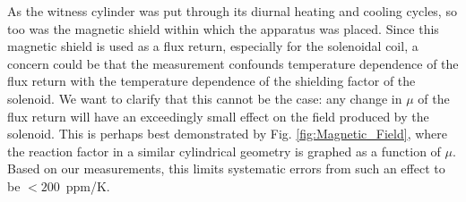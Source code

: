 




As the witness cylinder was put through its diurnal heating and
cooling cycles, so too was the magnetic shield within which the
apparatus was placed.  Since this magnetic shield is used as a flux
return, especially for the solenoidal coil, a concern could be that
the measurement confounds temperature dependence of the flux return
with the temperature dependence of the shielding factor of the
solenoid.  We want to clarify that this cannot be the case: any change
in $\mu$ of the flux return will have an exceedingly small effect on
the field produced by the solenoid.  This is perhaps best demonstrated
by Fig. \ref{fig:Magnetic_Field}, where the reaction factor in a
similar cylindrical geometry is graphed as a function of $\mu$.  Based
on our measurements, this limits systematic errors from such an effect
to be $<200$~ppm/K.

